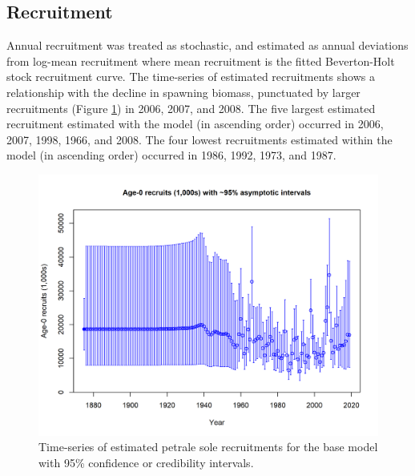 \documentclass[12pt,]{article}
\begin{document}
\FloatBarrier

\subsection*{Recruitment}\label{recruitment}

Annual recruitment was treated as stochastic, and estimated as annual
deviations from log-mean recruitment where mean recruitment is the
fitted Beverton-Holt stock recruitment curve. The time-series of
estimated recruitments shows a relationship with the decline in spawning
biomass, punctuated by larger recruitments (Figure
\ref{fig:Recruits_all}) in 2006, 2007, and 2008. The five largest
estimated recruitment estimated with the model (in ascending order)
occurred in 2006, 2007, 1998, 1966, and 2008. The four lowest
recruitments estimated within the model (in ascending order) occurred in
1986, 1992, 1973, and 1987.

\begin{figure}
\centering
\includegraphics{r4ss/plots_mod1/ts11_Age-0_recruits_(1000s)_with_95_asymptotic_intervals.png}
\caption{Time-series of estimated petrale sole recruitments for the base
model with 95\% confidence or credibility intervals.
\label{fig:Recruits_all}}
\end{figure}
\end{document}
